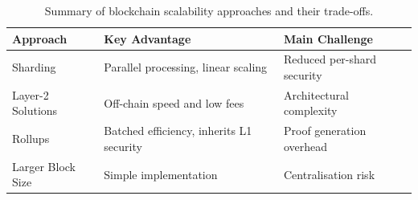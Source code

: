 \begin{table}[htbp]
\centering
\renewcommand{\arraystretch}{1.3}
\begin{tabularx}{\textwidth}{l X X}
\toprule
\textbf{Approach} & \textbf{Key Advantage} & \textbf{Main Challenge} \\
\midrule
Sharding            & Parallel processing, linear scaling     & Reduced per-shard security \\
Layer-2 Solutions   & Off-chain speed and low fees             & Architectural complexity \\
Rollups             & Batched efficiency, inherits L1 security & Proof generation overhead \\
Larger Block Size   & Simple implementation                    & Centralisation risk \\
\bottomrule
\end{tabularx}
\caption{Summary of blockchain scalability approaches and their trade-offs.}
\label{tab:scaling-summary}
\end{table}
